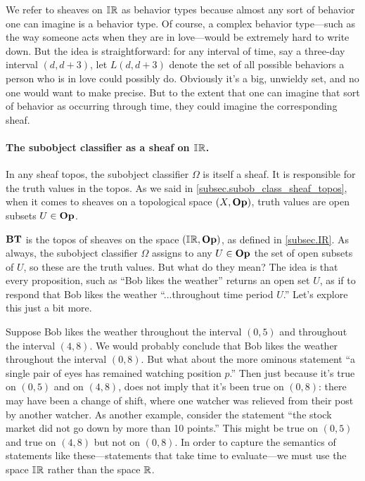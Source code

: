 \documentclass[7Sketches]{subfiles}
\begin{document}
We refer to sheaves on $\mathbb{I}\hspace{.6pt}\mathbb{R}$ as behavior types because almost any sort of behavior one can imagine is a behavior type. Of course, a complex behavior type---such as the way someone acts when they are in love---would be extremely hard to write down. But the idea is straightforward: for any interval of time, say a three-day interval $(d,d+3)$, let $L(d,d+3)$ denote the set of all possible behaviors a person who is in love could possibly do. Obviously it's a big, unwieldy set, and no one would want to make precise. But to the extent that one can imagine that sort of behavior as occurring through time, they could imagine the corresponding sheaf.

\paragraph{The subobject classifier as a sheaf on $\mathbb{I}\hspace{.6pt}\mathbb{R}$.}%
In any sheaf topos, the subobject classifier $\Omega$ is itself a sheaf. It is responsible for the truth values in the topos. As we said in \cref{subsec.subob_class_sheaf_topos}, when it comes to sheaves on a topological space $(X,\mathbf{Op})$, truth values are open subsets $U\in\mathbf{Op}$.

$\mathbf{BT}$ is the topos of sheaves on the space $(\mathbb{I}\hspace{.6pt}\mathbb{R},\mathbf{Op})$, as defined in \cref{subsec.IR}. As always, the subobject classifier $\Omega$ assigns to any $U\in\mathbf{Op}$ the set of open subsets of $U$, so these are the truth values. But what do they mean? The idea is that every proposition, such as ``Bob likes the weather'' returns an open set $U$, as if to respond that Bob likes the weather ``...throughout time period $U$.'' Let's explore this just a bit more.

Suppose Bob likes the weather throughout the interval $(0,5)$ and throughout the
interval $(4,8)$. We would probably conclude that Bob likes the weather
throughout the interval $(0,8)$. But what about the more ominous statement ``a
single pair of eyes has remained watching position $p$.'' Then just
because it's true on $(0,5)$ and on $(4,8)$, does not imply that it's been true
on $(0,8)$: there may have been a change of shift, where one watcher was
relieved from their post by another watcher. As another example, consider the
statement ``the stock market did not go down by more than 10 points.'' This
might be true on $(0,5)$ and true on $(4,8)$ but not on $(0,8)$. In order to
capture the semantics of statements like these---statements that take time to
evaluate---we must use the space $\mathbb{I}\hspace{.6pt}\mathbb{R}$ rather than the space $\mathbb{R}$.
\end{document}
